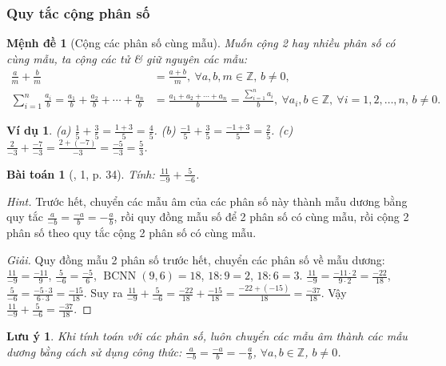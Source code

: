 \documentclass{article}
\newtheorem{baitoan}{Bài toán}
\newtheorem{luuy}{Lưu ý}
\newtheorem{menhde}{Mệnh đề}
\newtheorem{vidu}{Ví dụ}
\begin{document}
\subsubsection{Quy tắc cộng phân số}

\begin{menhde}[Cộng các phân số cùng mẫu]
	Muốn cộng 2 hay nhiều phân số có cùng mẫu, ta cộng các tử \& giữ nguyên các mẫu:
	\begin{align*}
		\frac{a}{m} + \frac{b}{m} &= \frac{a + b}{m},\ \forall a,b,m\in\mathbb{Z},\,b\ne0,\\
		\sum_{i=1}^n \frac{a_i}{b} = \frac{a_1}{b} + \frac{a_2}{b} + \cdots + \frac{a_n}{b} &= \frac{a_1 + a_2 + \cdots + a_n}{b} = \frac{\sum_{i=1}^n a_i}{b},\ \forall a_i,b\in\mathbb{Z},\ \forall i = 1,2,\ldots,n,\,b\ne0.
	\end{align*}
\end{menhde}

\begin{vidu}
	(a) $\frac{1}{5} + \frac{3}{5} = \frac{1 + 3}{5} = \frac{4}{5}$. (b) $\frac{-1}{5} + \frac{3}{5} = \frac{-1 + 3}{5} = \frac{2}{5}$. (c) $\frac{2}{-3} + \frac{-7}{-3} = \frac{2 + (-7)}{-3} = \frac{-5}{-3} = \frac{5}{3}$.
\end{vidu}

\begin{baitoan}[\cite{SGK_Toan_6_Canh_Dieu_tap_2}, 1, p. 34]
	Tính: $\frac{11}{-9} + \frac{5}{-6}$.
\end{baitoan}
\noindent\textit{Hint.} Trước hết, chuyển các mẫu âm của các phân số này thành mẫu dương bằng quy tắc $\frac{a}{-b} = \frac{-a}{b} = -\frac{a}{b}$, rồi quy đồng mẫu số để 2 phân số có cùng mẫu, rồi cộng 2 phân số theo quy tắc cộng 2 phân số có cùng mẫu.

\begin{proof}[Giải]
	Quy đồng mẫu 2 phân số trước hết, chuyển các phân số về mẫu dương: $\frac{11}{-9} = \frac{-11}{9}$, $\frac{5}{-6} = \frac{-5}{6}$, $\operatorname{BCNN}(9,6) = 18$, $18:9 = 2$, $18:6 = 3$. $\frac{11}{-9} = \frac{-11\cdot2}{9\cdot2} = \frac{-22}{18}$, $\frac{5}{-6} = \frac{-5\cdot3}{6\cdot3} = \frac{-15}{18}$. Suy ra $\frac{11}{-9} + \frac{5}{-6} = \frac{-22}{18} + \frac{-15}{18} = \frac{-22 + (-15)}{18} = \frac{-37}{18}$. Vậy $\frac{11}{-9} + \frac{5}{-6} = \frac{-37}{18}$.
\end{proof}

\begin{luuy}
	Khi tính toán với các phân số, luôn chuyển các mẫu âm thành các mẫu dương bằng cách sử dụng công thức: $\frac{a}{-b} = \frac{-a}{b} = -\frac{a}{b}$, $\forall a,b\in\mathbb{Z}$, $b\ne0$.
\end{luuy}
\end{document}
